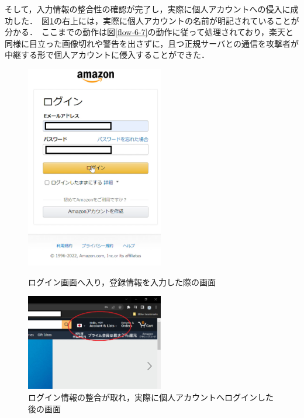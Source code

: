 \documentclass[dvipdfmx,twocolumn]{jsarticle}
\begin{document}
                そして，入力情報の整合性の確認が完了し，実際に個人アカウントへの侵入に成功した．\
                図\ref{amazon-03}の右上には，実際に個人アカウントの名前が明記されていることが分かる．\
                ここまでの動作は図\ref{flow-6-7}の動作に従って処理されており，楽天と同様に目立った画像切れや警告を出さずに，且つ正規サーバとの通信を攻撃者が中継する形で個人アカウントに侵入することができた．\
                \begin{figure}[h]
                    \centering
                    \includegraphics[width=6cm]{img/amazon/amazon-02.png}
                    \caption{ログイン画面へ入り，登録情報を入力した際の画面}
                    \label{amazon-02}
                    \includegraphics[width=6cm]{img/amazon/amazon-03.png}
                    \caption{ログイン情報の整合が取れ，実際に個人アカウントへログインした後の画面}
                    \label{amazon-03}
                \end{figure}
\end{document}
